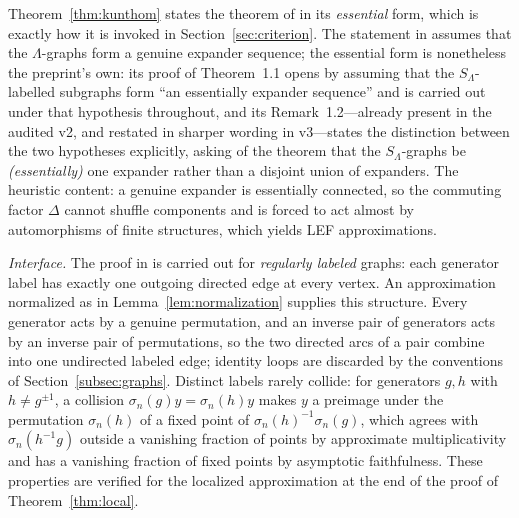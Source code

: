 \documentclass[11pt]{amsart}
\theoremstyle{definition}
\theoremstyle{plain}
\begin{document}
Theorem~\ref{thm:kunthom} states the theorem of \cite{KunThom19} in its \emph{essential} form, which is exactly how it is invoked in Section~\ref{sec:criterion}.  The statement in \cite{KunThom19} assumes that the \(\Lambda\)-graphs form a genuine expander sequence; the essential form is nonetheless the preprint's own: its proof of Theorem~1.1 opens by assuming that the \(S_\Lambda\)-labelled subgraphs form ``an essentially expander sequence'' and is carried out under that hypothesis throughout, and its Remark~1.2---already present in the audited v2, and restated in sharper wording in v3---states the distinction between the two hypotheses explicitly, asking of the theorem that the \(S_\Lambda\)-graphs be \emph{(essentially)} one expander rather than a disjoint union of expanders.  The heuristic content: a genuine expander is essentially connected, so the commuting factor \(\Delta\) cannot shuffle components and is forced to act almost by automorphisms of finite structures, which yields LEF approximations.

\emph{Interface.}  The proof in \cite{KunThom19} is carried out for \emph{regularly labeled} graphs: each generator label has exactly one outgoing directed edge at every vertex.  An approximation normalized as in Lemma~\ref{lem:normalization} supplies this structure.  Every generator acts by a genuine permutation, and an inverse pair of generators acts by an inverse pair of permutations, so the two directed arcs of a pair combine into one undirected labeled edge; identity loops are discarded by the conventions of Section~\ref{subsec:graphs}.  Distinct labels rarely collide: for generators \(g,h\) with \(h\ne g^{\pm1}\), a collision \(\sigma_n(g)y=\sigma_n(h)y\) makes \(y\) a preimage under the permutation \(\sigma_n(h)\) of a fixed point of \(\sigma_n(h)^{-1}\sigma_n(g)\), which agrees with \(\sigma_n(h^{-1}g)\) outside a vanishing fraction of points by approximate multiplicativity and has a vanishing fraction of fixed points by asymptotic faithfulness.  These properties are verified for the localized approximation at the end of the proof of Theorem~\ref{thm:local}.
\end{document}
